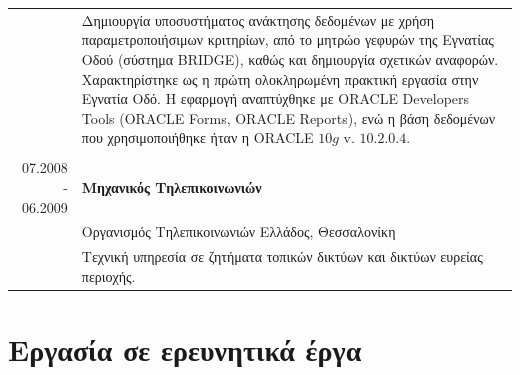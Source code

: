 \documentclass[a4paper,10pt,twoside]{article}
\begin{document}
\begin{tabular}{rp{12cm}}
                  & Δημιουργία υποσυστήματος ανάκτησης δεδομένων με χρήση παραμετροποιήσιμων
                    κριτηρίων, από το μητρώο γεφυρών της Εγνατίας Οδού (σύστημα BRIDGE), καθώς και
                    δημιουργία σχετικών αναφορών. Χαρακτηρίστηκε ως η πρώτη ολοκληρωμένη πρακτική
                    εργασία στην Εγνατία Οδό. Η εφαρμογή αναπτύχθηκε με ORACLE Developers Tools
                    (ORACLE Forms, ORACLE Reports), ενώ η βάση δεδομένων που χρησιμοποιήθηκε ήταν η ORACLE $10g$ v. $10.2.0.4.$\\
&\\
07.2008 - 06.2009 & \textbf{Μηχανικός Τηλεπικοινωνιών} \\
                  & Οργανισμός Τηλεπικοινωνιών Ελλάδος, Θεσσαλονίκη\\
                  & Τεχνική υπηρεσία σε ζητήματα τοπικών δικτύων και δικτύων ευρείας περιοχής. \\
\end{tabular}
\newpage


\section{Εργασία σε ερευνητικά έργα}
\end{document}
